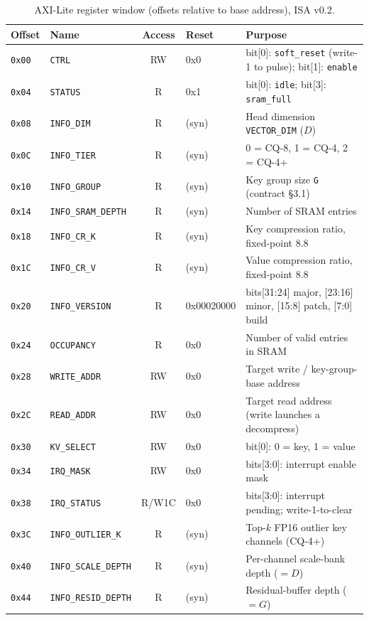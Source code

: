 \documentclass[11pt]{article}
\begin{document}
\begin{table}[h]
\centering
\small
\caption{AXI-Lite register window (offsets relative to base address), ISA v0.2.}
\label{tab:regs}
\begin{tabular}{@{}l l c l p{6cm}@{}}
\toprule
Offset & Name & Access & Reset & Purpose \\
\midrule
\texttt{0x00} & \texttt{CTRL}              & RW    & 0x0   & bit[0]: \texttt{soft\_reset} (write-1 to pulse); bit[1]: \texttt{enable} \\
\texttt{0x04} & \texttt{STATUS}            & R     & 0x1   & bit[0]: \texttt{idle}; bit[3]: \texttt{sram\_full} \\
\texttt{0x08} & \texttt{INFO\_DIM}         & R     & (syn) & Head dimension \texttt{VECTOR\_DIM} ($D$) \\
\texttt{0x0C} & \texttt{INFO\_TIER}        & R     & (syn) & 0 = CQ-8, 1 = CQ-4, 2 = CQ-4+ \\
\texttt{0x10} & \texttt{INFO\_GROUP}       & R     & (syn) & Key group size \texttt{G} (contract \S3.1) \\
\texttt{0x14} & \texttt{INFO\_SRAM\_DEPTH} & R     & (syn) & Number of SRAM entries \\
\texttt{0x18} & \texttt{INFO\_CR\_K}       & R     & (syn) & Key compression ratio, fixed-point 8.8 \\
\texttt{0x1C} & \texttt{INFO\_CR\_V}       & R     & (syn) & Value compression ratio, fixed-point 8.8 \\
\texttt{0x20} & \texttt{INFO\_VERSION}     & R     & 0x00020000 & bits[31:24] major, [23:16] minor, [15:8] patch, [7:0] build \\
\texttt{0x24} & \texttt{OCCUPANCY}         & R     & 0x0   & Number of valid entries in SRAM \\
\texttt{0x28} & \texttt{WRITE\_ADDR}       & RW    & 0x0   & Target write / key-group-base address \\
\texttt{0x2C} & \texttt{READ\_ADDR}        & RW    & 0x0   & Target read address (write launches a decompress) \\
\texttt{0x30} & \texttt{KV\_SELECT}        & RW    & 0x0   & bit[0]: 0 = key, 1 = value \\
\texttt{0x34} & \texttt{IRQ\_MASK}         & RW    & 0x0   & bits[3:0]: interrupt enable mask \\
\texttt{0x38} & \texttt{IRQ\_STATUS}       & R/W1C & 0x0   & bits[3:0]: interrupt pending; write-1-to-clear \\
\texttt{0x3C} & \texttt{INFO\_OUTLIER\_K}  & R     & (syn) & Top-$k$ FP16 outlier key channels (CQ-4+) \\
\texttt{0x40} & \texttt{INFO\_SCALE\_DEPTH}& R     & (syn) & Per-channel scale-bank depth ($=D$) \\
\texttt{0x44} & \texttt{INFO\_RESID\_DEPTH}& R     & (syn) & Residual-buffer depth ($=G$) \\
\bottomrule
\end{tabular}
\end{table}
\end{document}
